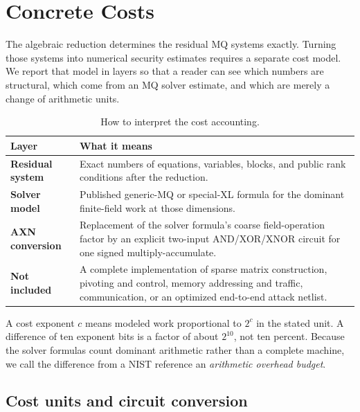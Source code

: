 \documentclass[11pt]{article}
\begin{document}
\section{Concrete Costs}\label{sec:complexity}

The algebraic reduction determines the residual MQ systems exactly.  Turning
those systems into numerical security estimates requires a separate cost
model.  We report that model in layers so that a reader can see which numbers
are structural, which come from an MQ solver estimate, and which are merely a
change of arithmetic units.

\begin{table}[H]
\centering
\caption{How to interpret the cost accounting.}
\label{tab:cost-layers}
\small
\renewcommand{\arraystretch}{1.12}
\begin{tabularx}{0.96\textwidth}{@{}>{\bfseries}p{}X@{}}
\toprule
Layer & What it means\\
\midrule
Residual system & Exact numbers of equations, variables, blocks, and public
rank conditions after the reduction.\\
Solver model & Published generic-MQ or special-XL formula for the dominant
finite-field work at those dimensions.\\
AXN conversion & Replacement of the solver formula's coarse field-operation
factor by an explicit two-input AND/XOR/XNOR circuit for one signed
multiply-accumulate.\\
Not included & A complete implementation of sparse matrix construction,
pivoting and control, memory addressing and traffic, communication, or an
optimized end-to-end attack netlist.\\
\bottomrule
\end{tabularx}
\end{table}

A cost exponent $c$ means modeled work proportional to $2^c$ in the stated
unit.  A difference of ten exponent bits is a factor of about $2^{10}$, not ten
percent.  Because the solver formulas count dominant arithmetic rather than a
complete machine, we call the difference from a NIST reference an
\emph{arithmetic overhead budget}.

\subsection{Cost units and circuit conversion}\label{sec:units}
\end{document}
